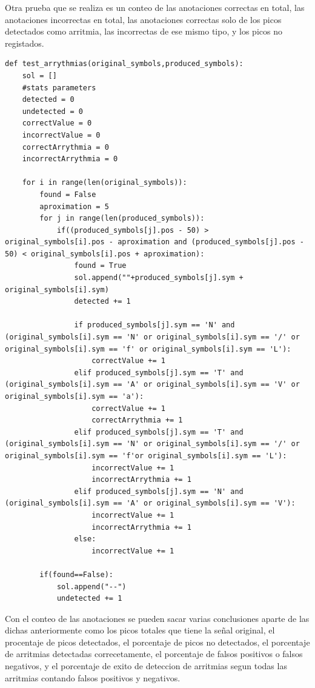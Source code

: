 Otra prueba que se realiza es un conteo de las anotaciones correctas en total, las anotaciones incorrectas en total, las anotaciones
correctas solo de los picos detectados como arritmia, las incorrectas de ese mismo tipo, y los picos no registados. 

\lstset{language=python, breaklines=true, basicstyle=\footnotesize}
\begin{lstlisting}[frame=single]
def test_arrythmias(original_symbols,produced_symbols):
    sol = []
    #stats parameters
    detected = 0
    undetected = 0
    correctValue = 0
    incorrectValue = 0
    correctArrythmia = 0
    incorrectArrythmia = 0
    
    for i in range(len(original_symbols)):
        found = False
        aproximation = 5
        for j in range(len(produced_symbols)):
            if((produced_symbols[j].pos - 50) > original_symbols[i].pos - aproximation and (produced_symbols[j].pos - 50) < original_symbols[i].pos + aproximation):
                found = True
                sol.append(""+produced_symbols[j].sym + original_symbols[i].sym)
                detected += 1
                
                if produced_symbols[j].sym == 'N' and (original_symbols[i].sym == 'N' or original_symbols[i].sym == '/' or original_symbols[i].sym == 'f' or original_symbols[i].sym == 'L'):
                    correctValue += 1
                elif produced_symbols[j].sym == 'T' and (original_symbols[i].sym == 'A' or original_symbols[i].sym == 'V' or original_symbols[i].sym == 'a'):
                    correctValue += 1
                    correctArrythmia += 1
                elif produced_symbols[j].sym == 'T' and (original_symbols[i].sym == 'N' or original_symbols[i].sym == '/' or original_symbols[i].sym == 'f'or original_symbols[i].sym == 'L'):
                    incorrectValue += 1
                    incorrectArrythmia += 1
                elif produced_symbols[j].sym == 'N' and (original_symbols[i].sym == 'A' or original_symbols[i].sym == 'V'):
                    incorrectValue += 1
                    incorrectArrythmia += 1
                else:
                    incorrectValue += 1
                
        if(found==False):
            sol.append("--")
            undetected += 1
\end{lstlisting}

Con el conteo de las anotaciones se pueden sacar varias conclusiones aparte de las dichas 
anteriormente como los picos totales que tiene la señal original, el procentaje de picos 
detectados, el porcentaje de picos no detectados, el porcentaje de arritmias detectadas 
correcetamente, el porcentaje de falsos positivos o falsos negativos, y el porcentaje de exito de deteccion de 
arritmias segun todas las arritmias contando falsos positivos y negativos.


